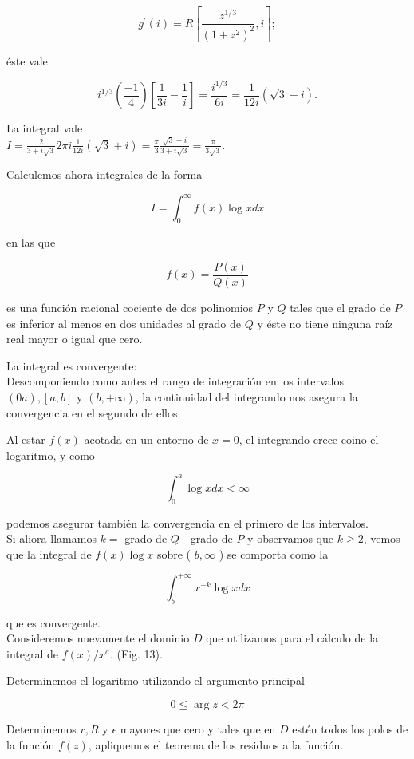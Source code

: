 \documentclass[10pt]{article}
\theoremstyle{plain}
\theoremstyle{definition}
\theoremstyle{remark}
\begin{document}
$$
g^{\prime}(i)=R\left[\frac{z^{1 / 3}}{\left(1+z^{2}\right)^{2}}, i\right] ;
$$

éste vale

$$
i^{1 / 3}\left(\frac{-1}{4}\right)\left[\frac{1}{3 i}-\frac{1}{i}\right]=\frac{i^{1 / 3}}{6 i}=\frac{1}{12 i}(\sqrt{3}+i) .
$$

La integral vale\\
$I=\frac{2}{3+i \sqrt{3}} 2 \pi i \frac{1}{12 i}(\sqrt{3}+i)=\frac{\pi}{3} \frac{\sqrt{3}+i}{3+i \sqrt{3}}=\frac{\pi}{3 \sqrt{3}}$.

Calculemos ahora integrales de la forma


\begin{equation*}
I=\int_{0}^{\infty} f(x) \log x d x \tag{$(27.4$}
\end{equation*}


en las que

$$
f(x)=\frac{P(x)}{Q(x)}
$$

es una función racional cociente de dos polinomios $P$ y $Q$ tales que el grado de $P$ es inferior al menos en dos unidades al grado de $Q$ y éste no tiene ninguna raíz real mayor o igual que cero.

La integral es convergente:\\
Descomponiendo como antes el rango de integración en los intervalos $(0 a),[a, b]$ y $(b,+\infty)$, la continuidad del integrando nos asegura la convergencia en el segundo de ellos.

Al estar $f(x)$ acotada en un entorno de $x=0$, el integrando crece coino el logaritmo, y como

$$
\int_{0}^{a} \log x d x<\infty
$$

podemos asegurar también la convergencia en el primero de los intervalos.\\
Si aliora llamamos $k=$ grado de $Q$ - grado de $P$ y observamos que $k \geqslant 2$, vemos que la integral de $f(x) \log x$ sobre ( $b, \infty$ ) se comporta como la

$$
\int_{b^{\prime}}^{+\infty} x^{-k} \log x d x
$$

que es convergente.\\
Consideremos nuevamente el dominio $D$ que utilizamos para el cálculo de la integral de $f(x) / x^{a}$. (Fig. 13).

Determinemos el logaritmo utilizando el argumento principal

$$
0 \leqslant \arg z<2 \pi
$$

Determinemos $r, R$ y $\epsilon$ mayores que cero y tales que en $D$ estén todos los polos de la función $f(z)$, apliquemos el teorema de los residuos a la función.
\end{document}
